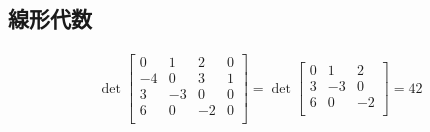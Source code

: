 \subsection{線形代数}
\begin{ans*}
  \begin{align}
    \det 
    \begin{bmatrix}
      0 & 1 & 2 & 0 \\
      -4 & 0 & 3 & 1 \\
      3 & -3 & 0 & 0 \\
      6 & 0 & -2 & 0 \\
    \end{bmatrix}
    = \det
    \begin{bmatrix}
      0  & 1  & 2  \\
      3  & -3 & 0  \\
      6  & 0  & -2 \\
    \end{bmatrix}
    = 42
  \end{align}
\end{ans*}

